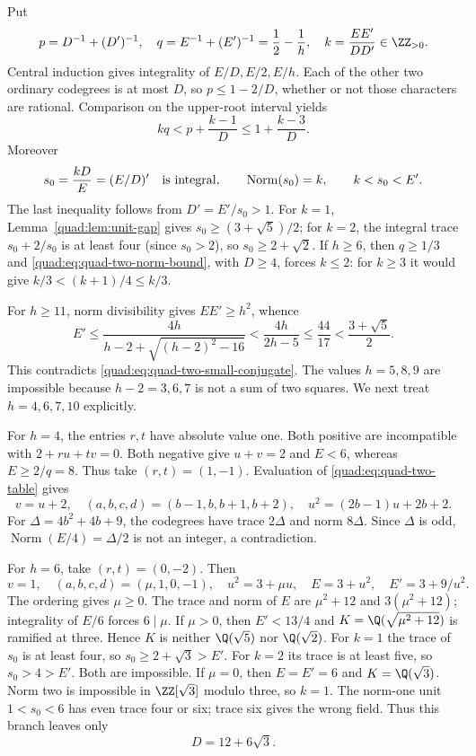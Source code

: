 Put
\[
 p=D^{-1}+(D')^{-1},\quad q=E^{-1}+(E')^{-1}=\frac12-\frac1h,
 \quad k=\frac{EE'}{DD'}\in\ZZ_{>0}.
\]
Central induction gives integrality of $E/D,E/2,E/h$.
Each of the other two ordinary codegrees is at most $D$, so
$p\le1-2/D$, whether or not those characters are rational.
Comparison on the upper-root interval yields
\begin{equation}\label{quad:eq:quad-two-norm-bound}
 kq<p+\frac{k-1}{D}\le1+\frac{k-3}{D}.
\end{equation}
Moreover
\begin{equation}\label{quad:eq:quad-two-small-conjugate}
 s_0=\frac{kD}{E}=(E/D)'\quad\hbox{is integral},\qquad
 \operatorname{Norm}(s_0)=k,\qquad k<s_0<E'.
\end{equation}
The last inequality follows from $D'=E'/s_0>1$.
For $k=1$, Lemma~\ref{quad:lem:unit-gap} gives $s_0\ge(3+\sqrt5)/2$;
for $k=2$, the integral trace $s_0+2/s_0$ is at least four
(since $s_0>2$), so $s_0\ge2+\sqrt2$.
If $h\ge6$, then $q\ge1/3$ and
\eqref{quad:eq:quad-two-norm-bound}, with $D\ge4$, forces $k\le2$:
for $k\ge3$ it would give
$k/3<(k+1)/4\le k/3$.

For $h\ge11$, norm divisibility gives $EE'\ge h^2$, whence
\[
 E'\le\frac{4h}{h-2+\sqrt{(h-2)^2-16}}
    <\frac{4h}{2h-5}\le\frac{44}{17}
    <\frac{3+\sqrt5}{2}.
\]
This contradicts \eqref{quad:eq:quad-two-small-conjugate}.
The values $h=5,8,9$ are impossible because $h-2=3,6,7$ is not
a sum of two squares. We next treat $h=4,6,7,10$ explicitly.

For $h=4$, the entries $r,t$ have absolute value one. Both positive
are incompatible with $2+ru+tv=0$. Both negative give $u+v=2$
and $E<6$, whereas $E\ge2/q=8$. Thus take $(r,t)=(1,-1)$.
Evaluation of \eqref{quad:eq:quad-two-table} gives
\[
 v=u+2,\quad(a,b,c,d)=(b-1,b,b+1,b+2),\quad
 u^2=(2b-1)u+2b+2.
\]
For $\Delta=4b^2+4b+9$, the codegrees have trace $2\Delta$ and
norm $8\Delta$. Since $\Delta$ is odd,
$\operatorname{Norm}(E/4)=\Delta/2$ is not an integer, a contradiction.

For $h=6$, take $(r,t)=(0,-2)$. Then
\[
 v=1,\quad(a,b,c,d)=(\mu,1,0,-1),\quad
 u^2=3+\mu u,\quad E=3+u^2,\quad E'=3+9/u^2.
\]
The ordering gives $\mu\ge0$. The trace and norm of $E$ are
$\mu^2+12$ and $3(\mu^2+12)$; integrality of $E/6$ forces
$6\mid\mu$. If $\mu>0$, then $E'<13/4$ and
$K=\Q(\sqrt{\mu^2+12})$ is ramified at three. Hence
$K$ is neither $\Q(\sqrt5)$ nor $\Q(\sqrt2)$.
For $k=1$ the trace of $s_0$ is at least four, so
$s_0\ge2+\sqrt3>E'$. For $k=2$ its trace is at least five, so
$s_0>4>E'$. Both are impossible.
If $\mu=0$, then $E=E'=6$ and $K=\Q(\sqrt3)$.
Norm two is impossible in $\ZZ[\sqrt3]$ modulo three,
so $k=1$. The norm-one unit $1<s_0<6$ has even trace four or six;
trace six gives the wrong field. Thus this branch leaves only
\begin{equation}\label{quad:eq:quad-two-residual-three}
 D=12+6\sqrt3.
\end{equation}

